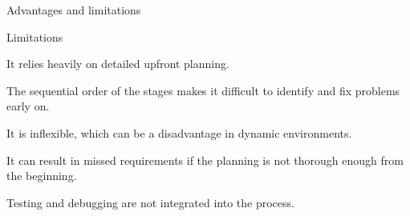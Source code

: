 \begin{frame}{Advantages and limitations}
    \begin{alertblock}{Limitations}
        \item It relies heavily on detailed upfront planning.
               
        \item The sequential order of the stages makes it difficult to identify and fix problems early on.
        
        \item It is inflexible, which can be a disadvantage in dynamic environments.
        \
        \item It can result in missed requirements if the planning is not thorough enough from the beginning.
        
        \item Testing and debugging are not integrated into the process.
        
    \end{alertblock}
\end{frame}